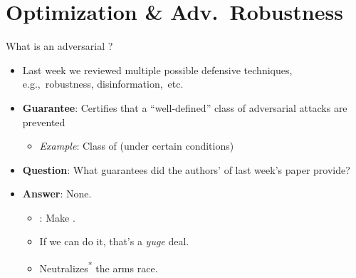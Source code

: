 \section{Optimization \& Adv.\ Robustness}


\begin{frame}{What is an adversarial ?}
  \begin{itemize}[<+->]
    \setlength{\itemsep}{20pt}
    \item Last week we reviewed multiple possible defensive techniques, e.g.,~robustness, disinformation,~etc.
    \item \textbf{Guarantee}: Certifies that a ``well-defined'' class of adversarial attacks are prevented
      \begin{itemize}
        \item \textit{Example}: Class of \textbf{} (under certain conditions)
      \end{itemize}

    \item \textbf{Question}: What guarantees did the authors' of last week's paper provide?
    \vspace{-14pt}
    \item \textbf{Answer}: None. 
      \begin{itemize}[<+->]
        \item \textbf{}: Make \textbf{}.
        \item If we can do it, that's a \textit{yuge} deal.
        \item Neutralizes\textsuperscript{*} the arms race.
      \end{itemize}
  \end{itemize}
\end{frame}


